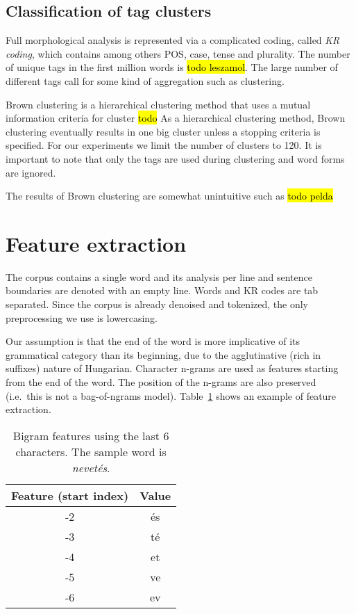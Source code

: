 \documentclass{article}
\begin{document}
\subsection{Classification of tag clusters}

Full morphological analysis is represented via a complicated coding, called \emph{KR coding}, which contains among others POS, case, tense and plurality.
The number of unique tags in the first million words is \hl{todo leszamol}.
The large number of different tags call for some kind of aggregation such as clustering.

Brown clustering is a hierarchical clustering method that uses a mutual information criteria for cluster \hl{todo}
As a hierarchical clustering method, Brown clustering eventually results in one big cluster unless a stopping criteria is specified.
For our experiments we limit the number of clusters to 120.
It is important to note that only the tags are used during clustering and word forms are ignored.

The results of Brown clustering are somewhat unintuitive such as \hl{todo pelda}

\section{Feature extraction}

The corpus contains a single word and its analysis per line and sentence boundaries are denoted with an empty line.
Words and KR codes are tab separated.
Since the corpus is already denoised and tokenized, the only preprocessing we use is lowercasing.

Our assumption is that the end of the word is more implicative of its grammatical category than its beginning, due to the agglutinative (rich in suffixes) nature of Hungarian.
Character n-grams are used as features starting from the end of the word.
The position of the n-grams are also preserved (i.e.~this is not a bag-of-ngrams model).
Table~\ref{table:feat_extract} shows an example of feature extraction.


\begin{table}[t]
    \caption{Bigram features using the last 6 characters. The sample word is \emph{nevetés}.}
  \label{table:feat_extract}
  \centering
  \begin{tabular}{cc}
      \toprule
      Feature (start index) & Value \\
      \midrule
      -2 & és \\
      -3 & té \\
      -4 & et \\
      -5 & ve \\
      -6 & ev \\
      \bottomrule
  \end{tabular}
\end{table}
\end{document}
